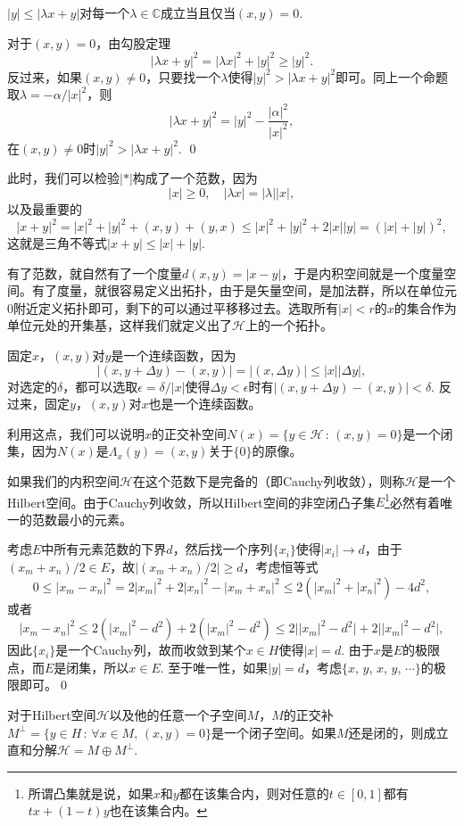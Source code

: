 \documentclass[9pt]{extbook}
\newcommand{\cc}{\mathbb{C}}
\begin{document}
\pro $|y|\leq |\lambda x+y|$对每一个$\lambda \in \cc$成立当且仅当$(x,y)=0$.

\proof 对于$(x,y)=0$，由勾股定理
\[
	|\lambda x+y|^2=|\lambda x|^2+ |y|^2\geq |y|^2.
\]
反过来，如果$(x,y)\neq 0$，只要找一个$\lambda$使得$|y|^2>|\lambda x+y|^2$即可。同上一个命题取$\lambda=-\alpha/|x|^2$，则
\[
	|\lambda x+y|^2=|y|^2-\frac{|\alpha|^2}{|x|^2},
\]
在$(x,y)\neq 0$时$|y|^2>|\lambda x+y|^2$. \qed

此时，我们可以检验$|*|$构成了一个范数，因为
\[
	|x|\geq 0,\quad |\lambda x|=|\lambda||x|,
\]
以及最重要的
\[
	|x+y|^2=|x|^2+|y|^2+(x,y)+(y,x)\leq |x|^2+|y|^2+2|x||y|=(|x|+|y|)^2,
\]
这就是三角不等式$|x+y|\leq |x|+|y|$.

\para 有了范数，就自然有了一个度量$d(x,y)=|x-y|$，于是内积空间就是一个度量空间。有了度量，就很容易定义出拓扑，由于是矢量空间，是加法群，所以在单位元$0$附近定义拓扑即可，剩下的可以通过平移移过去。选取所有$|x|<r$的$x$的集合作为单位元处的开集基，这样我们就定义出了$\mathcal{H}$上的一个拓扑。

固定$x$，$(x,y)$对$y$是一个连续函数，因为
\[
	|(x,y+\Delta y)-(x,y)|=|(x,\Delta y)|\leq |x||\Delta y|,
\]
对选定的$\delta$，都可以选取$\epsilon=\delta/|x|$使得$\Delta y<\epsilon$时有$|(x,y+\Delta y)-(x,y)|<\delta$. 反过来，固定$y$，$(x,y)$对$x$也是一个连续函数。

利用这点，我们可以说明$x$的正交补空间$N(x)=\{y\in\mathcal{H}\,:\, (x,y)=0\}$是一个闭集，因为$N(x)$是$\Lambda_x(y)=(x,y)$关于$\{0\}$的原像。

\para 如果我们的内积空间$\mathcal{H}$在这个范数下是完备的（即Cauchy列收敛），则称$\mathcal{H}$是一个Hilbert空间。由于Cauchy列收敛，所以Hilbert空间的非空闭凸子集$E$\footnote{所谓凸集就是说，如果$x$和$y$都在该集合内，则对任意的$t\in [0,1]$都有$tx+(1-t)y$也在该集合内。}必然有着唯一的范数最小的元素。

\proof 考虑$E$中所有元素范数的下界$d$，然后找一个序列$\{x_i\}$使得$|x_i|\to d$，由于$(x_m+x_n)/2\in E$，故$|(x_m+x_n)/2|\geq d$，考虑恒等式
\[
	0\leq |x_m-x_n|^2=2|x_m|^2+2|x_n|^2-|x_m+x_n|^2\leq 2(|x_m|^2+|x_n|^2)-4d^2,
\]
或者
\[
	|x_m-x_n|^2\leq 2(|x_m|^2-d^2)+2(|x_m|^2-d^2)\leq 2\bigl||x_m|^2-d^2\bigr|+2\bigl||x_m|^2-d^2\bigr|,
\]
因此$\{x_i\}$是一个Cauchy列，故而收敛到某个$x\in H$使得$|x|=d$. 由于$x$是$E$的极限点，而$E$是闭集，所以$x\in E$. 至于唯一性，如果$|y|=d$，考虑$\{x$, $y$, $x$, $y$, $\cdots\}$的极限即可。\qed

\pro 对于Hilbert空间$\mathcal{H}$以及他的任意一个子空间$M$，$M$的正交补$M^\bot=\{y\in H\,:\, \forall x\in M,\, (x,y)=0\}$是一个闭子空间。如果$M$还是闭的，则成立直和分解$\mathcal{H}=M\oplus M^\bot$.
\end{document}
